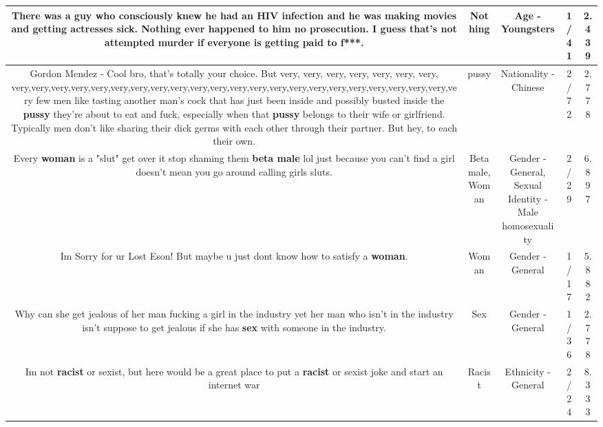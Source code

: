 \documentclass[11pt]{article}
\newlength\mylength
\begin{document}
\begin{center}
\begin{longtable}{|C{.65\mylength}|C{.30\mylength}|C{.12\mylength}|C{.12\mylength}|C{.12\mylength}|}
  \small There was a guy who consciously knew he had an HIV infection and he was making movies and getting actresses sick. \textbf{Nothing} ever happened to him no prosecution. I guess that's not attempted murder if everyone is getting paid to f***.\normalsize   & Nothing & Age - Youngsters & 1/41 & 2.439 \\  \hline
  \small Gordon Mendez - Cool bro, that's totally your choice.  But very, very, very, very, very, very, very, very,very,very,very,very,very,very,very,very,very,very,very,very,very,very,very,very,very,very,very,very,very,very few men like tasting another man's cock that has just been inside and possibly busted inside the \textbf{pussy} they're about to eat and fuck, especially when that \textbf{pussy} belongs to their wife or girlfriend.  Typically men don't like sharing their dick germs with each other through their partner.   But hey, to each their own.\normalsize   & pussy & Nationality - Chinese & 2/72 & 2.778 \\  \hline
  \small Every \textbf{woman} is a "slut" get over it stop shaming them \textbf{beta male} lol just because you can't find a girl doesn't  mean you go around calling girls sluts.\normalsize   & Beta male, Woman & Gender - General, Sexual Identity - Male homosexuality & 2/29 & 6.897 \\  \hline
  \small Im Sorry for ur Lost Eson! But maybe u just dont know how to satisfy a \textbf{woman}.\normalsize   & Woman & Gender - General & 1/17 & 5.882 \\  \hline
  \small Why can she get jealous of her man fucking a girl in the industry yet her man who isn't in the industry  isn't suppose to get jealous if she has \textbf{sex} with someone in the industry.\normalsize   & Sex & Gender - General & 1/36 & 2.778 \\  \hline
  \small Im not \textbf{racist} or sexist, but here would be a great place to put a \textbf{racist} or sexist joke and start an internet war\normalsize   & Racist & Ethnicity - General & 2/24 & 8.333 \\  \hline

\end{longtable}
\end{center}
\end{document}

